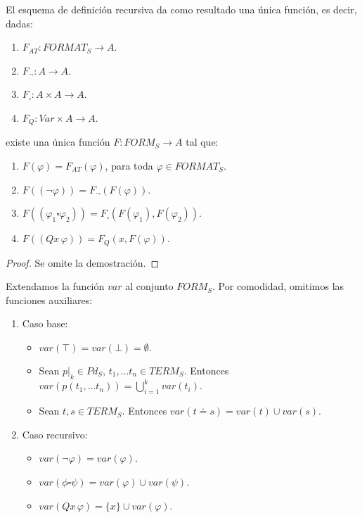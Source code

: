  \begin{prop} El esquema de definición recursiva da como resultado una única función, es decir, dadas:
\begin{enumerate}
    \item $F_{AT}: FORMAT_S \rightarrow A$.
    \item $F_{\neg}: A \rightarrow A$.
    \item $F_{\square}: A \times A \rightarrow A$.
    \item $F_Q:Var\times A\rightarrow A$.
\end{enumerate}
existe una única función $F: FORM_S \rightarrow A$ tal que:
\begin{enumerate}
    \item $F(\varphi) = F_{AT}(\varphi)$, para toda $\varphi \in FORMAT_S$.
    \item $F((\neg \varphi)) = F_{\neg}(F(\varphi))$.
    \item $F((\varphi_1 \square \varphi_2)) = F_{\square}(F(\varphi_1), F(\varphi_2))$.
    \item $F((Qx\,\varphi))=F_Q(x,F(\varphi))$.
\end{enumerate}
\begin{proof}
     Se omite la demostración.
\end{proof}
\end{prop}


\begin{example}
Extendamos la función $var$ al conjunto $FORM_S$. Por comodidad, omitimos las funciones auxiliares:
\begin{enumerate}
    \item Caso base:
        \begin{itemize}
            \item $var(\top) = var(\bot) = \emptyset.$
            \item Sean $p|_k \in Pd_S$, $t_1, \dots t_n \in TERM_S$. Entonces $var(p(t_1, \dots t_n)) = \bigcup\limits_{i=1}^{k} var(t_i).$
            \item Sean $t, s \in TERM_S$. Entonces $var(t \doteq s) = var(t) \cup var(s)$.
        \end{itemize} 
    \item Caso recursivo:
        \begin{itemize}
            \item $var(\neg \varphi) = var(\varphi)$.
            \item $var(\phi \square \psi) = var(\varphi) \cup var(\psi)$.
            \item $var(Qx \, \varphi) = \{x\} \cup var(\varphi)$.
        \end{itemize}
\end{enumerate}
\end{example}

